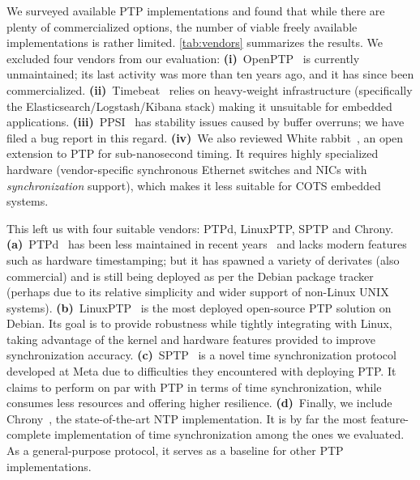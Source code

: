 We surveyed available PTP implementations and found that while there are plenty of commercialized options,
the number of viable freely available implementations is rather limited.
\cref{tab:vendors} summarizes the results. %
We excluded four vendors from our evaluation:
\textbf{(i)}~OpenPTP~\cite{openptp} is currently unmaintained; its last activity was more than ten years ago, and it has since been commercialized.
\textbf{(ii)}~Timebeat~\cite{timebeat} relies on heavy-weight infrastructure
(specifically the Elasticsearch/Logstash/Kibana stack) making it unsuitable for embedded applications.
\textbf{(iii)}~PPSI~\cite{ppsi} has stability issues caused by buffer overruns;
we have filed a bug report\cite{ppsi-bug-report} in this regard.
\textbf{(iv)}~We also reviewed White rabbit~\cite{white-rabbit},
an open extension to PTP for sub-nanosecond timing.
It requires highly specialized hardware
(vendor-specific synchronous Ethernet switches and NICs with \emph{synchronization} support),
which makes it less suitable for COTS embedded systems.

This left us with four suitable vendors: PTPd, LinuxPTP, SPTP and Chrony. %
\textbf{(a)}~PTPd~\cite{ptpd-manpage} %
has been less maintained in recent years~\cite{ptpd-maintainers} and lacks
modern features such as hardware timestamping;
but it has spawned a variety of derivates (also commercial) and is still being
deployed as per the Debian package tracker~\cite{debian-popularity-contest}
(perhaps due to its relative simplicity and wider support of non-Linux UNIX systems).
\textbf{(b)}~LinuxPTP~\cite{linuxptp-homepage} is the most deployed open-source
PTP solution on Debian.
Its goal is to provide robustness while tightly integrating with Linux, taking advantage of the kernel and hardware features provided to improve
synchronization accuracy.
\textbf{(c)}~SPTP~\cite{facebook-sptp} is a novel time synchronization protocol
developed at Meta due to difficulties they encountered with deploying PTP.
It claims to perform on par with PTP in terms of time synchronization,
while consumes less resources and offering higher resilience.
\textbf{(d)}~Finally, we include Chrony~\cite{??}, the state-of-the-art NTP implementation.
It is by far the most feature-complete implementation of time synchronization
among the ones we evaluated.
As a general-purpose protocol, %
it serves as a baseline for other PTP implementations.


